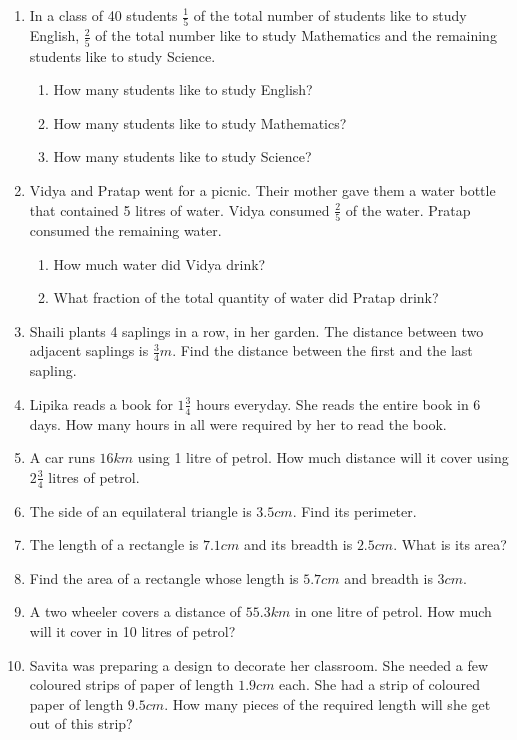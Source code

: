 \begin{enumerate}[label=\thesubsection.\arabic*,ref=\thesubsection.\theenumi,resume*]
	\item  In a class of 40 students $\frac{1}{5}$ of the total number of students like to study English, 
$\frac{2}{5}$ of the total number like to study Mathematics and the remaining students like to study Science.
\begin{enumerate}
	\item How many students like to study English?
	\item How many students like to study Mathematics?
	\item How many students like to study Science?
\end{enumerate}
\item Vidya and Pratap went for a picnic.  Their mother gave them a water bottle that contained 5 litres of water.  Vidya consumed $\frac{2}{5}$ of the water.  Pratap consumed the remaining water.
	\begin{enumerate}
		\item How much water did Vidya drink?
		\item What fraction of the total quantity of water did Pratap drink?
	\end{enumerate}
\item Shaili plants 4 saplings in a row, in her garden.  The distance between two adjacent saplings is $\frac{3}{4}m$. Find the distance between the first and the last sapling.
\item Lipika reads a book for $1\frac{3}{4}$ hours everyday.  She reads the entire book in 6 days.  How many hours in all were required by her to read the book.
\item A car runs $16km$ using 1 litre of petrol.  How much distance will it cover using $2\frac{3}{4}$ litres of petrol.
\item The side of an equilateral triangle is $3.5cm$.  Find its perimeter.  
\item The length of a rectangle is $7.1cm$ and its breadth is $2.5cm$.  What is its area?
\item Find the area of a rectangle whose length is $5.7cm$ and breadth is $3cm$. 
\item A two wheeler covers a distance of $55.3km$ in one litre of petrol.  How much will it cover in 10 litres of petrol?
\item Savita was preparing a design to decorate her classroom.  She needed a few coloured strips of paper of length $1.9cm$ each.  She had a strip of coloured paper of length $9.5cm$.  How many pieces of the required length will she get out of this strip? 

\end{enumerate}
